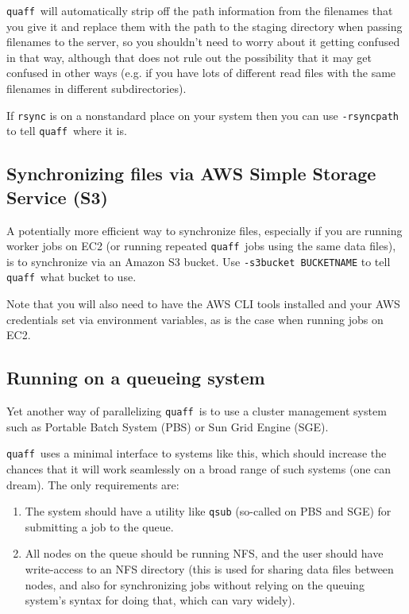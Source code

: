 \documentclass{article}
\newcommand\quaff{{\tt quaff}}
\newcommand\opt[1]{{\tt -#1}}
\begin{document}
\quaff\ will automatically strip off the path information from the filenames that you give it
and replace them with the path to the staging directory when passing filenames to the server,
so you shouldn't need to worry about it getting confused in that way,
although that does not rule out the possibility that it may get confused in other ways
(e.g. if you have lots of different read files with the same filenames in different subdirectories).

If {\tt rsync} is on a nonstandard place on your system then you can use \opt{rsyncpath} to tell \quaff\ where it is.

\subsection{Synchronizing files via AWS Simple Storage Service (S3)}

A potentially more efficient way to synchronize files, especially if you are running worker jobs on EC2
(or running repeated \quaff\ jobs using the same data files),
is to synchronize via an Amazon S3 bucket.
Use \opt{s3bucket BUCKETNAME} to tell \quaff\ what bucket to use.

Note that you will also need to have the AWS CLI tools installed and your AWS credentials set via environment variables,
as is the case when running jobs on EC2.

\subsection{Running on a queueing system}

Yet another way of parallelizing \quaff\ is to use a cluster management system
such as Portable Batch System (PBS) or Sun Grid Engine (SGE).

\quaff\ uses a minimal interface to systems like this, which should increase the chances
that it will work seamlessly on a broad range of such systems (one can dream).
The only requirements are:
\begin{enumerate}
\item The system should have a utility like {\tt qsub} (so-called on PBS and SGE)
  for submitting a job to the queue.
\item All nodes on the queue should be running NFS, and the user should have write-access
  to an NFS directory (this is used for sharing data files between nodes, and also for synchronizing jobs
  without relying on the queuing system's syntax for doing that, which can vary widely).
  \end{enumerate}
\end{document}
